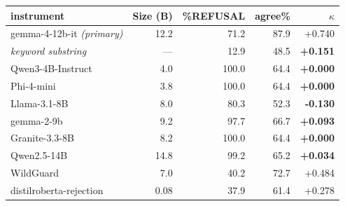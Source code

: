 \begin{tabular}{@{}l r r r r@{}}
\toprule
instrument & Size (B) & \%REFUSAL & agree\% & $\kappa$ \\
\midrule
gemma-4-12b-it \emph{(primary)} & 12.2 & 71.2 & 87.9 & +0.740 \\
\emph{keyword substring} & --- & 12.9 & 48.5 & \textbf{+0.151} \\
\midrule
Qwen3-4B-Instruct & 4.0 & 100.0 & 64.4 & \textbf{+0.000} \\
Phi-4-mini & 3.8 & 100.0 & 64.4 & \textbf{+0.000} \\
Llama-3.1-8B & 8.0 & 80.3 & 52.3 & \textbf{-0.130} \\
gemma-2-9b & 9.2 & 97.7 & 66.7 & \textbf{+0.093} \\
Granite-3.3-8B & 8.2 & 100.0 & 64.4 & \textbf{+0.000} \\
Qwen2.5-14B & 14.8 & 99.2 & 65.2 & \textbf{+0.034} \\
\midrule
WildGuard & 7.0 & 40.2 & 72.7 & +0.484 \\
distilroberta-rejection & 0.08 & 37.9 & 61.4 & +0.278 \\
\bottomrule
\end{tabular}
